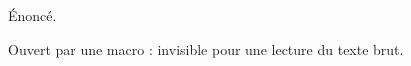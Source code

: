 \newcommand{\montheoreme}{\begin{theorem}}
\newcommand{\finmontheoreme}{\end{theorem}}

\begin{definition}
  Énoncé.
\end{definition} %

\montheoreme
  Ouvert par une macro : invisible pour une lecture du texte brut.
\finmontheoreme
